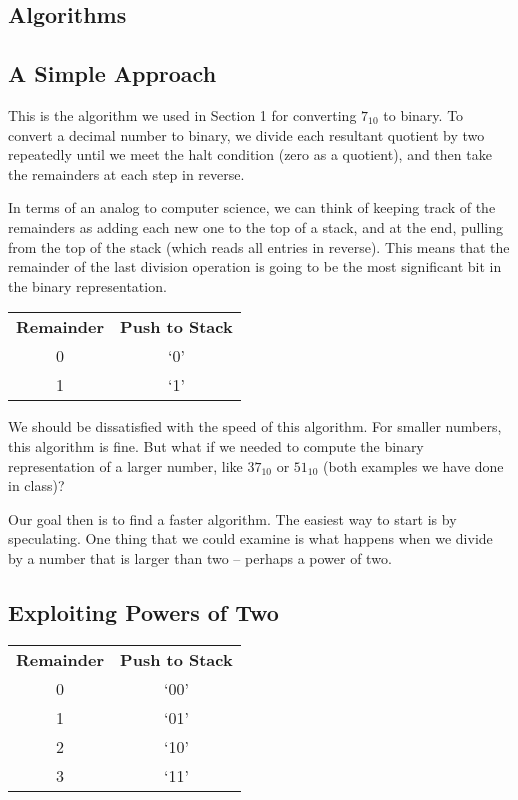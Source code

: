 \documentclass[12pt]{article}
\begin{document}
\begin{center}
  \section{Algorithms}
\end{center}
\subsection{A Simple Approach}
This is the algorithm we used in Section 1 for converting $7_{10}$ to binary.  To convert a decimal number to binary, we divide each resultant quotient by two repeatedly until we meet the halt condition (zero as a quotient), and then take the remainders at each step in reverse.

\par In terms of an analog to computer science, we can think of keeping track of the remainders as adding each new one to the top of a stack, and at the end, pulling from the top of the stack (which reads all entries in reverse). This means that the remainder of the last division operation is going to be the most significant bit in the binary representation.

\begin{center}
  \begin{tabular}{c|c}
    \textbf{Remainder} & \textbf{Push to Stack} \\
    0 & `0' \\
    1 & `1'
  \end{tabular}
\end{center}

\par We should be dissatisfied with the speed of this algorithm. For smaller numbers, this algorithm is fine. But what if we needed to compute the binary representation of a larger number, like $37_{10}$ or $51_{10}$ (both examples we have done in class)?

\par Our goal then is to find a faster algorithm. The easiest way to start is by speculating. One thing that we could examine is what happens when we divide by a number that is larger than two -- perhaps a power of two.

\subsection{Exploiting Powers of Two}
\begin{center}
  \begin{tabular}{c|c}
    \textbf{Remainder} & \textbf{Push to Stack} \\
    0 & `00' \\
    1 & `01' \\
    2 & `10' \\
    3 & `11'
  \end{tabular}
\end{center}
\end{document}
